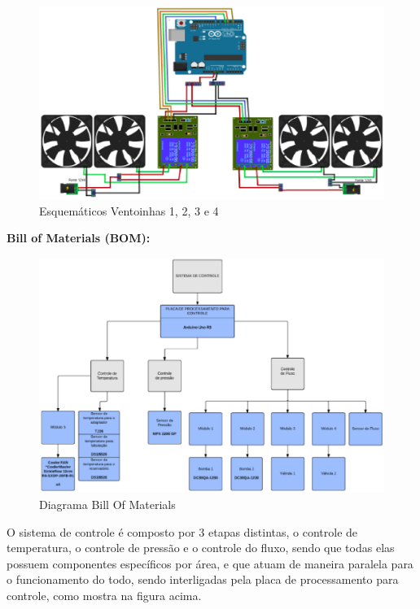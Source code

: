 \begin{itemize}
    \begin{figure}[hb]                  
        \centering                          
        \includegraphics[scale=0.7]{figuras/vent1234.eps}
        \caption{ Esquemáticos Ventoinhas 1, 2, 3 e 4 }   \label{figvent1234}              
    \end{figure} 

\end{itemize}
\newpage
\textbf{Bill of Materials (BOM):} 

\begin{figure}[ht]                                          
    \includegraphics[scale=0.8]{figuras/bom.eps}
    \caption{ Diagrama Bill Of Materials }   \label{figbom}              
\end{figure} 

O sistema de controle é composto por 3 etapas distintas, o controle de temperatura, o controle de pressão e o controle do fluxo, sendo que todas elas possuem componentes específicos por área, e que atuam de maneira paralela para o funcionamento do todo, sendo interligadas pela placa de processamento para controle, como mostra na figura acima.

